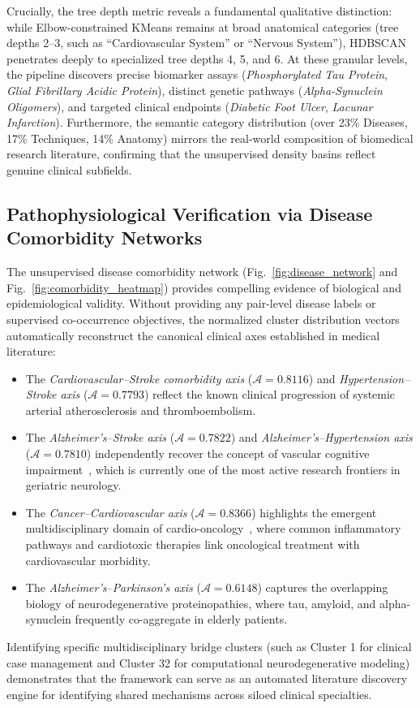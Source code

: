 \documentclass[a4paper,10pt,conference]{IEEEtran}
\begin{document}
Crucially, the tree depth metric reveals a fundamental qualitative distinction: while Elbow-constrained KMeans remains at broad anatomical categories (tree depths 2--3, such as ``Cardiovascular System'' or ``Nervous System''), HDBSCAN penetrates deeply to specialized tree depths 4, 5, and 6. At these granular levels, the pipeline discovers precise biomarker assays (\textit{Phosphorylated Tau Protein}, \textit{Glial Fibrillary Acidic Protein}), distinct genetic pathways (\textit{Alpha-Synuclein Oligomers}), and targeted clinical endpoints (\textit{Diabetic Foot Ulcer}, \textit{Lacunar Infarction}). Furthermore, the semantic category distribution (over 23\% Diseases, 17\% Techniques, 14\% Anatomy) mirrors the real-world composition of biomedical research literature, confirming that the unsupervised density basins reflect genuine clinical subfields.

\subsection{Pathophysiological Verification via Disease Comorbidity Networks}

The unsupervised disease comorbidity network (Fig.~\ref{fig:disease_network} and Fig.~\ref{fig:comorbidity_heatmap}) provides compelling evidence of biological and epidemiological validity. Without providing any pair-level disease labels or supervised co-occurrence objectives, the normalized cluster distribution vectors automatically reconstruct the canonical clinical axes established in medical literature:
\begin{itemize}
\item The \textit{Cardiovascular--Stroke comorbidity axis} ($\mathcal{A}=0.8116$) and \textit{Hypertension--Stroke axis} ($\mathcal{A}=0.7793$) reflect the known clinical progression of systemic arterial atherosclerosis and thromboembolism.
\item The \textit{Alzheimer's--Stroke axis} ($\mathcal{A}=0.7822$) and \textit{Alzheimer's--Hypertension axis} ($\mathcal{A}=0.7810$) independently recover the concept of vascular cognitive impairment~\cite{ref40}, which is currently one of the most active research frontiers in geriatric neurology.
\item The \textit{Cancer--Cardiovascular axis} ($\mathcal{A}=0.8366$) highlights the emergent multidisciplinary domain of cardio-oncology~\cite{ref39}, where common inflammatory pathways and cardiotoxic therapies link oncological treatment with cardiovascular morbidity.
\item The \textit{Alzheimer's--Parkinson's axis} ($\mathcal{A}=0.6148$) captures the overlapping biology of neurodegenerative proteinopathies, where tau, amyloid, and alpha-synuclein frequently co-aggregate in elderly patients.
\end{itemize}
Identifying specific multidisciplinary bridge clusters (such as Cluster 1 for clinical case management and Cluster 32 for computational neurodegenerative modeling) demonstrates that the framework can serve as an automated literature discovery engine for identifying shared mechanisms across siloed clinical specialties.
\end{document}
